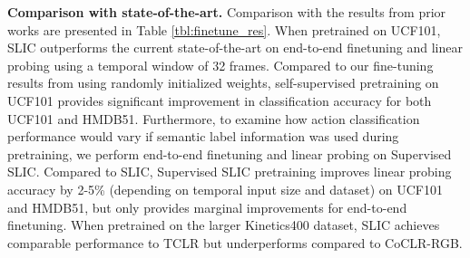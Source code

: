 \documentclass[10pt,twocolumn,letterpaper]{article}
\begin{document}
\textbf{Comparison with state-of-the-art.} Comparison with the results from prior works are presented in Table \ref{tbl:finetune_res}. When pretrained on UCF101, SLIC outperforms the current state-of-the-art on end-to-end finetuning and linear probing using a temporal window of 32 frames. Compared to our fine-tuning results from using randomly initialized weights, self-supervised pretraining on UCF101 provides significant improvement in classification accuracy for both UCF101 and HMDB51. Furthermore, to examine how action classification performance would vary if semantic label information was used during pretraining, we perform end-to-end finetuning and linear probing on Supervised SLIC. Compared to SLIC, Supervised SLIC pretraining improves linear probing accuracy by 2-5\% (depending on temporal input size and dataset) on UCF101 and HMDB51, but only provides marginal improvements for end-to-end finetuning. 
When pretrained on the larger Kinetics400 dataset, SLIC achieves comparable performance to TCLR\cite{dave2021tclr} but underperforms compared to CoCLR-RGB\cite{coclr}. 
\end{document}
